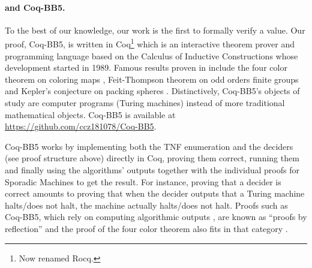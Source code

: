 \documentclass[a4paper,british]{article}
\theoremstyle{definition} %
\numberwithin{equation}{section}
\theoremstyle{definition} %
\newcommand{\CoqBB}{Coq-BB5\xspace}
\begin{document}


\paragraph{\Coq and \CoqBB.} To the best of our knowledge, our work is the first to formally verify a \BBfull value. Our proof, \CoqBB, is written in Coq\footnote{Now renamed Rocq.} \cite{the_coq_development_team_2024_14542673} which is an interactive theorem prover and programming language based on the Calculus of Inductive Constructions \cite{CoC} whose development started in 1989. Famous results proven in \Coq include the four color theorem on coloring maps \cite{fourColour, fourColourCoq}, Feit-Thompson theorem on odd orders finite groups \cite{feitThompson} and Kepler's conjecture on packing spheres \cite{flyspeck}. Distinctively, \CoqBB's objects of study are computer programs (Turing machines) instead of more traditional mathematical objects. \CoqBB is available at \url{https://github.com/ccz181078/Coq-BB5}.

\CoqBB works by implementing both the TNF enumeration and the deciders (see proof structure above) directly in Coq, proving them correct, running them and finally using the algorithms' outputs together with the individual proofs for Sporadic Machines to get the result. For instance, proving that a decider is correct amounts to proving that when the decider outputs that a Turing machine halts/does not halt, the machine actually halts/does not halt. Proofs such as \CoqBB, which rely on computing algorithmic outputs \cite{vmcompute,nativecompute}, are known as ``proofs by reflection'' \cite{boutin1997} and the \Coq proof of the four color theorem also fits in that category \cite{fourColourCoq}.
\end{document}
